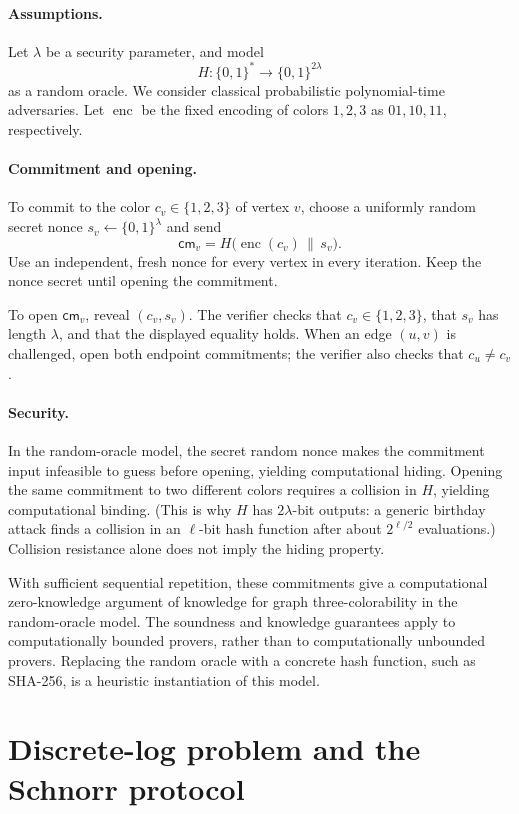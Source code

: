 \paragraph{Assumptions.}
Let $\lambda$ be a security parameter, and model
\[
H:\{0,1\}^{*}\longrightarrow\{0,1\}^{2\lambda}
\]
as a random oracle. We consider classical probabilistic
polynomial-time adversaries. Let $\operatorname{enc}$ be the
fixed encoding of colors $1,2,3$ as $01,10,11$, respectively.

\paragraph{Commitment and opening.}
To commit to the color $c_v\in\{1,2,3\}$ of vertex $v$, choose
a uniformly random secret nonce $s_v\leftarrow\{0,1\}^{\lambda}$
and send
\[
\mathsf{cm}_v=H\bigl(\operatorname{enc}(c_v)\,\|\,s_v\bigr).
\]
Use an independent, fresh nonce for every vertex in every
iteration. Keep the nonce secret until opening the commitment.

To open $\mathsf{cm}_v$, reveal $(c_v,s_v)$. The verifier checks that
$c_v\in\{1,2,3\}$, that $s_v$ has length $\lambda$, and that
the displayed equality holds. When an edge $(u,v)$ is
challenged, open both endpoint commitments; the verifier
also checks that $c_u\ne c_v$.

\paragraph{Security.}
In the random-oracle model, the secret random nonce makes
the commitment input infeasible to guess before opening,
yielding computational hiding. Opening the same commitment
to two different colors requires a collision in $H$, yielding computational binding.
(This is why $H$ has $2\lambda$-bit outputs: a generic birthday
attack finds a collision in an $\ell$-bit hash function after
about $2^{\ell/2}$ evaluations.) Collision resistance alone
does not imply the hiding property.

With sufficient sequential repetition, these commitments
give a computational zero-knowledge argument of knowledge
for graph three-colorability in the random-oracle model.
The soundness and knowledge guarantees apply to
computationally bounded provers, rather than to
computationally unbounded provers. Replacing the random
oracle with a concrete hash function, such as SHA-256, is
a heuristic instantiation of this model.

\section{Discrete-log problem and the Schnorr protocol}

